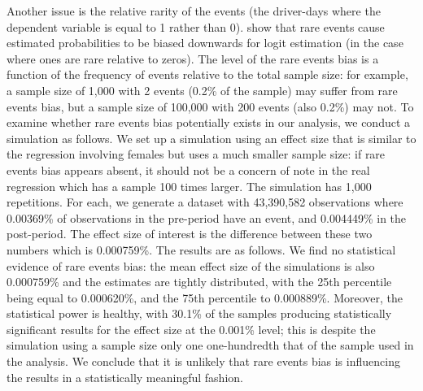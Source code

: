 Another issue is the relative rarity of the events 
(the driver-days where the dependent variable is equal to 1 rather than 0). 
\citet{kingzheng2001}
show that rare events cause estimated probabilities to be biased downwards for logit estimation 
(in the case where ones are rare relative to zeros). 
The level of the rare events bias is a function of 
the frequency of events relative to the total sample size: 
for example, a sample size of 1,000 with 2 events (0.2\% of the sample) 
may suffer from rare events bias, 
but a sample size of 100,000 with 200 events (also 0.2\%) may not. 
To examine whether rare events bias potentially exists in our analysis, 
we conduct a simulation as follows. 
We set up a simulation using an effect size that is similar to the regression involving females but uses a much smaller sample size: 
if rare events bias appears absent, 
it should not be a concern of note in the real regression 
which has a sample 100 times larger. 
The simulation has 1,000 repetitions. 
For each, we generate a dataset with 43,390,582 observations 
where 0.00369\% of observations in the pre-period have an event, 
and 0.004449\% in the post-period. 
The effect size of interest is the difference between these two numbers which is 0.000759\%. 
The results are as follows. 
We find no statistical evidence of rare events bias: 
the mean effect size of the simulations is also 0.000759\% 
and the estimates are tightly distributed, 
with the 25th percentile being equal to 0.000620\%, 
and the 75th percentile to 0.000889\%. 
Moreover, the statistical power is healthy, 
with 30.1\% of the samples producing statistically significant results 
for the effect size at the 0.001\% level; 
this is despite the simulation using a sample size only one one-hundredth 
that of the sample used in the analysis. 
We conclude that it is unlikely that rare events bias 
is influencing the results in a statistically meaningful fashion.



